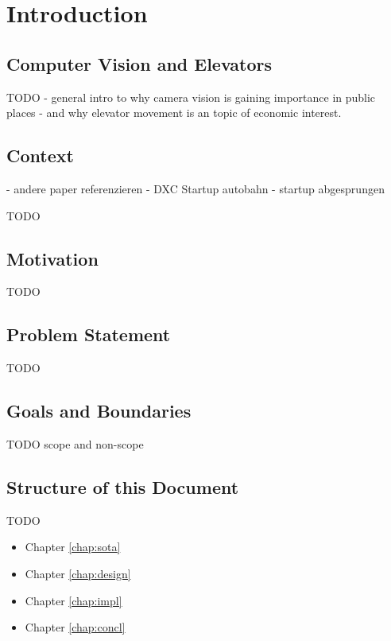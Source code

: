 \chapter{Introduction}
\label{chap:intro}

\section{Computer Vision and Elevators}



TODO
- general intro to why camera vision is gaining importance in public places 
- and why elevator movement is an topic of economic interest.


\section{Context}

- andere paper referenzieren
- DXC Startup autobahn 
- startup abgesprungen

TODO

\section{Motivation}

TODO

\section{Problem Statement}

TODO

\section{Goals and Boundaries}

TODO scope and non-scope

\section{Structure of this Document}

TODO

\begin{itemize}
    \item Chapter \ref{chap:sota}
    \item Chapter \ref{chap:design}
    \item Chapter \ref{chap:impl}
    \item Chapter \ref{chap:concl}
\end{itemize}